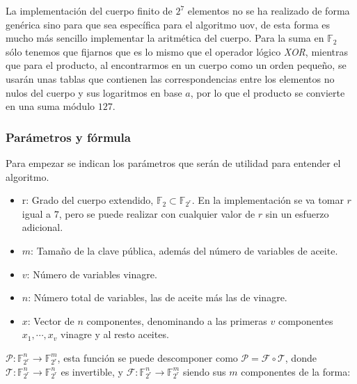 La implementación del cuerpo finito de $2^7$ elementos no se ha realizado de forma genérica sino para que sea específica para el algoritmo \acrshort{uov}, de esta forma es mucho más sencillo implementar la aritmética del cuerpo. Para la suma en $\mathds{F}_2$ sólo tenemos que fijarnos que es lo mismo que el operador lógico \textit{XOR}, mientras que para el producto, al encontrarmos en un cuerpo como un orden pequeño, se usarán unas tablas que contienen las correspondencias entre los elementos no nulos del cuerpo y sus logaritmos en base $a$, por lo que el producto se convierte en una suma módulo $127$.\\




\subsubsection{Parámetros y fórmula}
Para empezar se indican los parámetros que serán de utilidad para entender el algoritmo.
\begin{itemize}
	\item r: Grado del cuerpo extendido, $\mathds{F}_2 \subset \mathds{F}_{2^r}$. En la implementación se va tomar $r$ igual a $7$, pero se puede realizar con cualquier valor de $r$ sin un esfuerzo adicional.
	\item $m$: Tamaño de la clave pública, además del número de variables de aceite.
	\item $v$: Número de variables vinagre.
	\item $n$: Número total de variables, las de aceite más las de vinagre.
	\item $x$: Vector de $n$ componentes, denominando a las primeras $v$ componentes  $x_1, \dotsb, x_v$ vinagre y al resto aceites.
	
	
\end{itemize}

$\mathcal{P}: \mathds{F}_{2^r}^n \rightarrow \mathds{F}_{2^r}^m$, esta función se puede descomponer como $\mathcal{P} = \mathcal{F} \circ \mathcal{T}$, donde $\mathcal{T}: \mathds{F}_{2^r}^n \rightarrow \mathds{F}_{2^r}^n$ es invertible, y $\mathcal{F}: \mathds{F}_{2^r}^n \rightarrow \mathds{F}_{2^r}^m$ siendo sus $m$ componentes de la forma:

